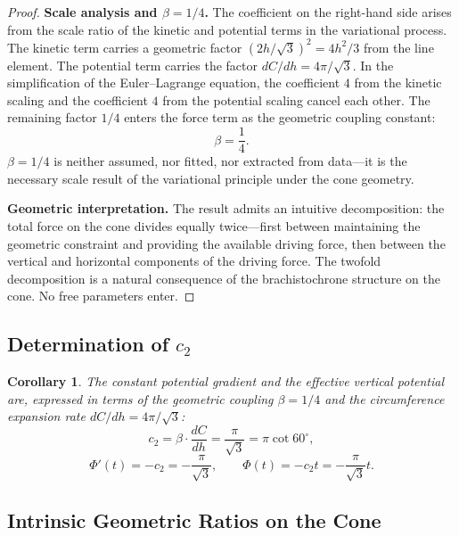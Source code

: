 \documentclass[12pt,a4paper]{article}
\newtheorem{corollary}[theorem]{Corollary}
\begin{document}
\begin{proof}
\textbf{Scale analysis and $\beta = 1/4$.} The coefficient on the right-hand side arises from the scale ratio of the kinetic and potential terms in the variational process. The kinetic term carries a geometric factor $(2h/\sqrt{3})^2 = 4h^2/3$ from the line element. The potential term carries the factor $dC/dh = 4\pi/\sqrt{3}$. In the simplification of the Euler--Lagrange equation, the coefficient $4$ from the kinetic scaling and the coefficient $4$ from the potential scaling cancel each other. The remaining factor $1/4$ enters the force term as the geometric coupling constant:
\begin{equation}
\beta = \frac{1}{4}.
\end{equation}
$\beta = 1/4$ is neither assumed, nor fitted, nor extracted from data---it is the necessary scale result of the variational principle under the cone geometry.

\textbf{Geometric interpretation.} The result admits an intuitive decomposition: the total force on the cone divides equally twice---first between maintaining the geometric constraint and providing the available driving force, then between the vertical and horizontal components of the driving force. The twofold decomposition is a natural consequence of the brachistochrone structure on the cone. No free parameters enter.
\end{proof}

\subsection{Determination of $c_2$}

\begin{corollary}
The constant potential gradient and the effective vertical potential are, expressed in terms of the geometric coupling $\beta = 1/4$ and the circumference expansion rate $dC/dh = 4\pi/\sqrt{3}$:
\begin{equation}
c_2 = \beta \cdot \frac{dC}{dh} = \frac{\pi}{\sqrt{3}} = \pi\cot 60^\circ,
\end{equation}
\begin{equation}
\Phi'(t) = -c_2 = -\frac{\pi}{\sqrt{3}}, \qquad \Phi(t) = -c_2 t = -\frac{\pi}{\sqrt{3}}t.
\end{equation}
\end{corollary}

\subsection{Intrinsic Geometric Ratios on the Cone}
\end{document}
